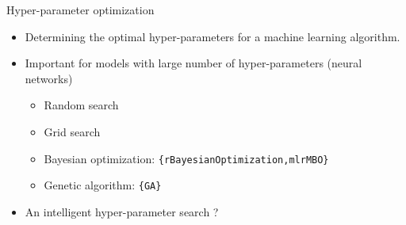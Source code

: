 \documentclass[12pt,ignorenonframetext,]{beamer}
\providecommand{\tightlist}{%
  \setlength{\itemsep}{0pt}\setlength{\parskip}{0pt}}
\begin{document}
\begin{frame}{Hyper-parameter optimization}
\protect\hypertarget{hyper-parameter-optimization}{}

\begin{itemize}
\tightlist
\item
  Determining the optimal hyper-parameters for a machine learning
  algorithm. \vspace{2mm}
\item
  Important for models with large number of hyper-parameters (neural
  networks)

  \begin{itemize}
      \item Random search
      \item Grid search
      \item Bayesian optimization: \texttt{\{rBayesianOptimization,mlrMBO\}}
      \item Genetic algorithm: \texttt{\{GA\}}
    \end{itemize}
   \vspace{2mm}
\item
  An intelligent hyper-parameter search ?
\end{itemize}

\end{frame}
\end{document}
